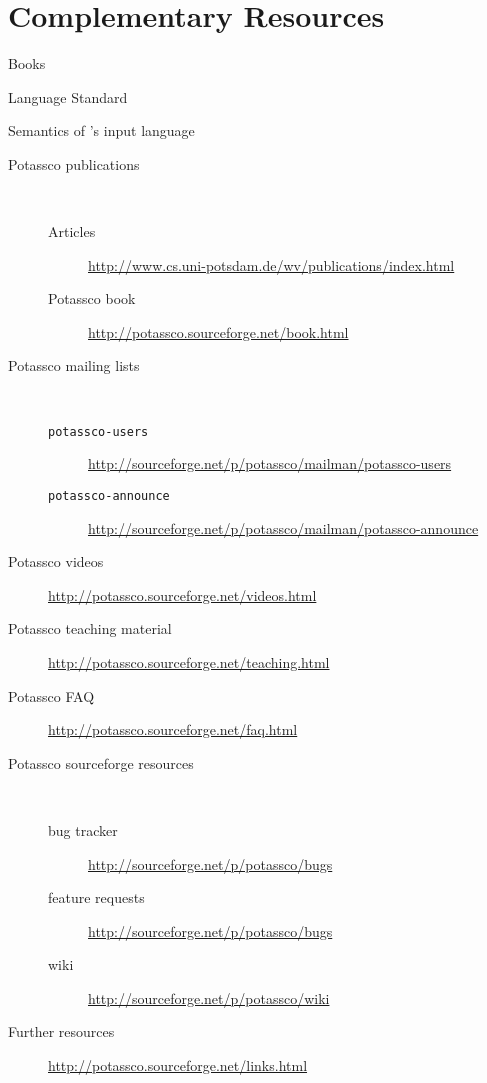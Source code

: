 
\section{Complementary Resources}
\label{sec:resources}

\begin{description}
\item [Books] \cite{baral03a,gekakasc12a,gelkah14a}
\item [Language Standard] \cite{aspcore2}
\item [Semantics of \gringo's input language] \cite{gehakalisc14a,haliya14a}
\item [Potassco publications] \
  \begin{description}
  \item [Articles]      \url{http://www.cs.uni-potsdam.de/wv/publications/index.html}
  \item [Potassco book] \url{http://potassco.sourceforge.net/book.html}
  \end{description}
\item [Potassco mailing lists] \
  \begin{description}
  \item [\texttt{potassco-users}]    \url{http://sourceforge.net/p/potassco/mailman/potassco-users}
  \item [\texttt{potassco-announce}] \url{http://sourceforge.net/p/potassco/mailman/potassco-announce}
  \end{description}
\item [Potassco videos]            \url{http://potassco.sourceforge.net/videos.html}
\item [Potassco teaching material] \url{http://potassco.sourceforge.net/teaching.html}
\item [Potassco FAQ]               \url{http://potassco.sourceforge.net/faq.html}
\item [Potassco sourceforge resources] \
  \begin{description}
  \item [bug tracker]      \url{http://sourceforge.net/p/potassco/bugs}
  \item [feature requests] \url{http://sourceforge.net/p/potassco/bugs}
  \item [wiki]             \url{http://sourceforge.net/p/potassco/wiki}
  \end{description}
\item [Further resources] \url{http://potassco.sourceforge.net/links.html}
\end{description}

